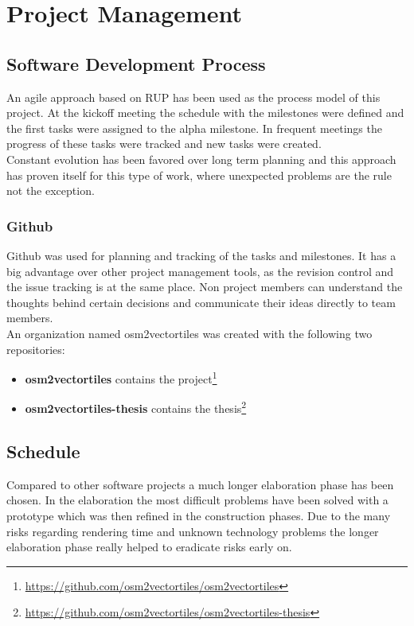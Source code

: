 \chapter{Project Management}\label{project-management}

\section{Software Development Process}

An agile approach based on RUP has been used as the process model of this project. At the kickoff meeting the schedule with the milestones were defined and the first tasks were assigned to the alpha milestone. In frequent meetings the progress of these tasks were tracked and new tasks were created.\\
Constant evolution has been favored over long term planning and this approach has proven itself for this type of work, where unexpected problems are the rule not the exception.

\subsection{Github}\label{github}
Github was used for planning and tracking of the tasks and milestones. It has a big advantage over other project management tools, as the revision control and the issue tracking is at the same place. Non project members can understand the thoughts behind certain decisions and communicate their ideas directly to team members.\\
An organization named osm2vectortiles was created with the following two repositories:

\begin{itemize}
\item
  \textbf{osm2vectortiles} contains the project\footnote{\url{https://github.com/osm2vectortiles/osm2vectortiles}}
\item
  \textbf{osm2vectortiles-thesis} contains the thesis\footnote{\url{https://github.com/osm2vectortiles/osm2vectortiles-thesis}}
\end{itemize}

\section{Schedule}

Compared to other software projects a much longer elaboration phase has been chosen. In the elaboration the most difficult problems have been solved with a prototype which was then refined in the construction phases. Due to the many risks regarding rendering time and unknown technology problems the longer elaboration phase really helped to eradicate risks early on.

